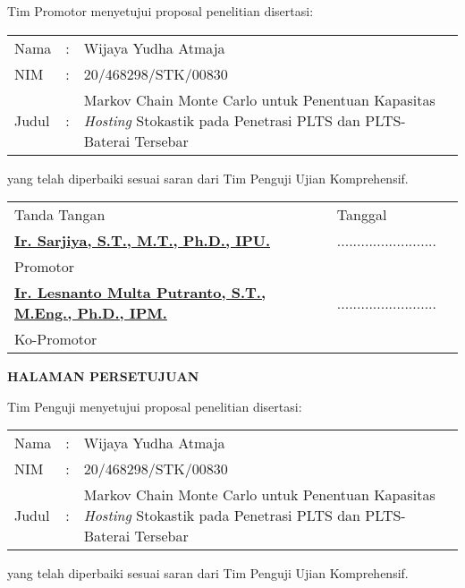\vspace*{8pt}
\noindent Tim Promotor menyetujui proposal penelitian disertasi:
\vspace*{-8pt}
{
\begin{longtable}{llp{330pt}}
\hspace*{-14pt} Nama	&:& Wijaya Yudha Atmaja\\
\hspace*{-14pt} NIM		&:& 20/468298/STK/00830\\
\hspace*{-14pt} Judul	&:& Markov Chain Monte Carlo untuk Penentuan Kapasitas \textit{Hosting} Stokastik pada Penetrasi PLTS dan PLTS-Baterai Tersebar
\end{longtable}
}
\vspace*{-22pt}
\noindent yang telah diperbaiki sesuai saran dari Tim Penguji Ujian Komprehensif.
\vspace*{4cm}

{
\begin{longtable}{lll}
	\vspace*{2.7cm}
	\hspace*{77pt}Tanda Tangan & \hspace*{24pt}Tanggal\\
	\hspace*{-24pt}\underline{\textbf{Ir. Sarjiya, S.T., M.T., Ph.D., IPU.}}					& \; .........................\\ \vspace*{2.5cm}\hspace*{-24pt}Promotor &\\
	\hspace*{-24pt}\underline{\textbf{Ir. Lesnanto Multa Putranto, S.T., M.Eng., Ph.D., IPM.}}	& \; .........................\\ 				\hspace*{-24pt}Ko-Promotor &\\
\end{longtable}
}

\newpage
\centerline{\fontsize{14}{16}\textbf{HALAMAN PERSETUJUAN}}
\vspace*{27pt}
\noindent Tim Penguji menyetujui proposal penelitian disertasi:
\vspace*{-8pt}
{
\begin{longtable}{llp{330pt}}
\hspace*{-14pt} Nama	&:&Wijaya Yudha Atmaja\\
\hspace*{-14pt} NIM		&:&20/468298/STK/00830\\
\hspace*{-14pt} Judul	&:&Markov Chain Monte Carlo untuk Penentuan Kapasitas \textit{Hosting} Stokastik pada Penetrasi PLTS dan PLTS-Baterai Tersebar
\end{longtable}
}
\vspace*{-22pt}
\noindent yang telah diperbaiki sesuai saran dari Tim Penguji Ujian Komprehensif.

